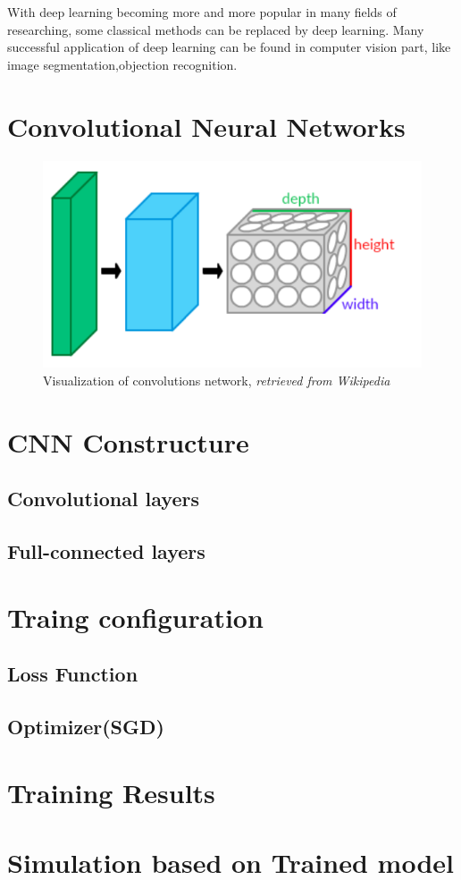     With deep learning becoming more and more popular in many fields of researching, some classical methods can be replaced by deep learning. Many successful application of deep learning can be found in computer vision part, like image segmentation\cite{lecun2015deep},objection recognition\cite{he2016deep}. 

\section{Convolutional Neural Networks}
    \begin{figure}[!h]
        \centering
        \includegraphics[scale = 0.5]{Figures/Conv_layers.png}
        \caption{Visualization of convolutions network, \textit{retrieved from Wikipedia}}
    \end{figure}

\section{CNN Constructure}
    \subsection{Convolutional layers}

    \subsection{Full-connected layers}

\section{Traing configuration}
    \subsection{Loss Function}

    \subsection{Optimizer(SGD)}

\section{Training Results}

\section{Simulation based on Trained model}